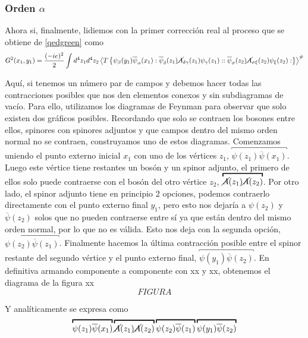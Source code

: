 \documentclass{article}
\numberwithin{equation}{section}
\begin{document}
\subsubsection*{Orden $\alpha$}

Ahora si, finalmente,
lidiemos con la primer corrección real al proceso que se obtiene de \ref{qedgreen} como
\begin{equation}\label{g2}
G^{2}(x_{1},y_{1})=\frac{(-ie)^{2}}{2}\int d^{4}z_{1}d^{4}z_{2}\left\langle T\left\{ \psi_{\beta}(y_{1})\overline{\psi}_{\alpha}(x_{1}):\overline{\psi}_{\delta}(z_{1})\cancel{A}_{\delta\gamma}(z_{1})\psi_{\gamma}(z_{1})::\overline{\psi}_{\sigma}(z_{2})\cancel{A}_{\sigma\xi}(z_{2})\psi_{\xi}(z_{2}):\right\} \right\rangle ^{\#}
\end{equation}

Aquí, si tenemos un número par de campos y debemos hacer todas las
contracciones posibles que nos den elementos conexos y sin subdiagramas
de vacío. Para ello, utilizamos los diagramas de Feynman para observar
que solo existen dos gráficos posibles. Recordando que solo se contraen
los bosones entre ellos, spinores con spinores adjuntos y que campos
dentro del mismo orden normal no se contraen, construyamos uno de
estos diagramas. Comenzamos uniendo el punto externo inicial $x_{1}$
con uno de los vértices $z_{1}$, $\overbracket{\psi(z_{1})\overline{\psi}(x_{1})}$.
Luego este vértice tiene restantes un bosón y un spinor adjunto, el
primero de ellos solo puede contraerse con el bosón del otro vértice
$z_{2}$, $\overbracket{\cancel{A}(z_{1})\cancel{A}(z_{2})}$. Por otro lado, el
spinor adjunto tiene en principio 2 opciones, podemos contraerlo directamente
con el punto externo final $y_{1}$, pero esto nos dejaría a $\psi(z_{2})$
y $\overline{\psi}(z_{2})$ solos que no pueden contraerse entre sí
ya que están dentro del mismo orden normal, por lo que no es válida.
Esto nos deja con la segunda opción, $\overbracket{\psi(z_{2})\overline{\psi}(z_{1})}$.
Finalmente hacemos la última contracción posible entre el spinor restante
del segundo vértice y el punto externo final, $\overbracket{\psi(y_{1})\overline{\psi}(z_{2})}$.
En definitiva armando componente a componente con xx y xx, obtenemos
el diagrama de la figura xx
\begin{equation}
FIGURA
\end{equation}

Y analíticamente se expresa como 
\begin{equation}\label{feyng2}
\overbracket{\psi(z_{1})\overline{\psi}(x_{1})}\overbracket{\cancel{A}(z_{1})\cancel{A}(z_{2})}\overbracket{\psi(z_{2})\overline{\psi}(z_{1})}\overbracket{\psi(y_{1})\overline{\psi}(z_{2})}
\end{equation}
\end{document}

